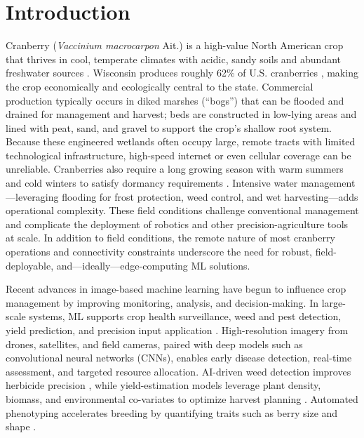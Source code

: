 \section{Introduction}

Cranberry (\textit{Vaccinium macrocarpon} Ait.) is a high-value North American crop that thrives in cool, temperate climates with acidic, sandy soils and abundant freshwater sources \cite{sandler_cranberry_2008}. Wisconsin produces roughly 62\% of U.S. cranberries \cite{usda-nass_cranberries_2024}, making the crop economically and ecologically central to the state. Commercial production typically occurs in diked marshes (“bogs”) that can be flooded and drained for management and harvest; beds are constructed in low-lying areas and lined with peat, sand, and gravel to support the crop’s shallow root system. Because these engineered wetlands often occupy large, remote tracts with limited technological infrastructure, high-speed internet or even cellular coverage can be unreliable. Cranberries also require a long growing season with warm summers and cold winters to satisfy dormancy requirements \cite{ellwood_cranberry_2014}. Intensive water management—leveraging flooding for frost protection, weed control, and wet harvesting—adds operational complexity. These field conditions challenge conventional management and complicate the deployment of robotics and other precision-agriculture tools at scale. In addition to field conditions, the remote nature of most cranberry operations and connectivity constraints underscore the need for robust, field-deployable, and—ideally—edge-computing ML solutions.

Recent advances in image-based machine learning have begun to influence crop management by improving monitoring, analysis, and decision-making. In large-scale systems, ML supports crop health surveillance, weed and pest detection, yield prediction, and precision input application \cite{akiva_vision_2022}. High-resolution imagery from drones, satellites, and field cameras, paired with deep models such as convolutional neural networks (CNNs), enables early disease detection, real-time assessment, and targeted resource allocation. AI-driven weed detection improves herbicide precision \cite{wendel_self-supervised_2016}, while yield-estimation models leverage plant density, biomass, and environmental co-variates to optimize harvest planning \cite{ni_deep_2020}. Automated phenotyping accelerates breeding by quantifying traits such as berry size and shape \cite{diaz-garcia_image-based_2018}.

